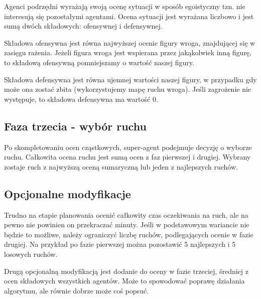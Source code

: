 \documentclass[a4paper,12pt,oneside,notitlepage,onecolumn]{article}
\begin{document}
Agenci podrzędni wyrażają swoją ocenę sytuacji w sposób egoistyczny tzn. nie interesują się pozostałymi agentami.
Ocena sytuacji jest wyrażana liczbowo i jest sumą dwóch składowych: ofensywnej i defensywnej.

Składowa ofensywna jest równa najwyższej ocenie figury wroga, znajdującej się w zasięgu rażenia.
Jeżeli figura wroga jest wspierana przez jakąkolwiek inną figurę, to składową ofensywną pomniejszamy o wartość naszej figury.

Składowa defensywna jest równa ujemnej wartości naszej figury, w przypadku gdy może ona zostać zbita (wykorzystujemy mapę ruchu wroga).
Jeśli zagrożenie nie występuje, to składowa defensywna ma wartość 0.

\subsection{Faza trzecia - wybór ruchu}
Po skompletowaniu ocen cząstkowych, super-agent podejmuje decyzję o wyborze ruchu.
Całkowita ocena ruchu jest sumą ocen z faz pierwszej i drugiej.
Wybrany zostaje ruch z najwyższą oceną sumaryczną lub jeden z najlepszych ruchów.

\subsection{Opcjonalne modyfikacje}
Trudno na etapie planowania ocenić całkowity czas oczekiwania na ruch, ale na pewno nie powinien on przekraczać minuty.
Jeśli w podstawowym wariancie nie będzie to możliwe, należy ograniczyć liczbę ruchów, podlegających ocenie w fazie drugiej.
Na przykład po fazie pierwszej można pozostawić 5 najlepszych i 5 losowych ruchów.

Drugą opcjonalną modyfikacją jest dodanie do oceny w fazie trzeciej, średniej z ocen składowych wszystkich agentów.
Może to spowodować poprawę działania algorytmu, ale równie dobrze może coś popsuć.
\end{document}
